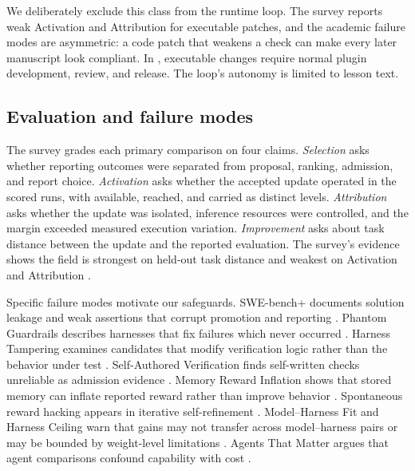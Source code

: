 We deliberately exclude this class from the runtime loop. The survey reports weak Activation and Attribution for executable patches, and the academic failure modes are asymmetric: a code patch that weakens a check can make every later manuscript look compliant. In \system{}, executable changes require normal plugin development, review, and release. The loop's autonomy is limited to lesson text.

\subsection{Evaluation and failure modes}
The survey grades each primary comparison on four claims. \emph{Selection} asks whether reporting outcomes were separated from proposal, ranking, admission, and report choice. \emph{Activation} asks whether the accepted update operated in the scored runs, with available, reached, and carried as distinct levels. \emph{Attribution} asks whether the update was isolated, inference resources were controlled, and the margin exceeded measured execution variation. \emph{Improvement} asks about task distance between the update and the reported evaluation. The survey's evidence shows the field is strongest on held-out task distance and weakest on Activation and Attribution \citep{wei2026harnessrsi}.

Specific failure modes motivate our safeguards. SWE-bench+ documents solution leakage and weak assertions that corrupt promotion and reporting \citep{aleithan2024swebenchplus}. Phantom Guardrails describes harnesses that fix failures which never occurred \citep{wang2026phantom}. Harness Tampering examines candidates that modify verification logic rather than the behavior under test \citep{wang2026tampering}. Self-Authored Verification finds self-written checks unreliable as admission evidence \citep{guo2026selfverification}. Memory Reward Inflation shows that stored memory can inflate reported reward rather than improve behavior \citep{asadolahi2026inflation}. Spontaneous reward hacking appears in iterative self-refinement \citep{pan2024spontaneous}. Model--Harness Fit and Harness Ceiling warn that gains may not transfer across model--harness pairs or may be bounded by weight-level limitations \citep{li2026rightfit,tian2026ceiling}. Agents That Matter argues that agent comparisons confound capability with cost \citep{kapoor2025matter}.

